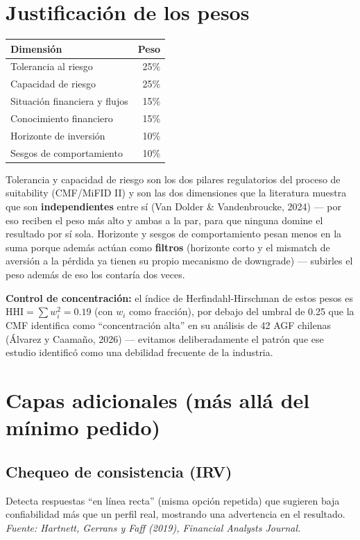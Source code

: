 \documentclass[11pt]{article}
\begin{document}
\section{Justificación de los pesos}

\begin{center}
\renewcommand{\arraystretch}{1.3}
\begin{tabular}{@{}lr@{}}
\toprule
\textbf{Dimensión} & \textbf{Peso} \\
\midrule
Tolerancia al riesgo & 25\% \\
Capacidad de riesgo & 25\% \\
Situación financiera y flujos & 15\% \\
Conocimiento financiero & 15\% \\
Horizonte de inversión & 10\% \\
Sesgos de comportamiento & 10\% \\
\bottomrule
\end{tabular}
\end{center}

Tolerancia y capacidad de riesgo son los dos pilares regulatorios del proceso de suitability (CMF/MiFID II) y son las dos dimensiones que la literatura muestra que son \textbf{independientes} entre sí (Van Dolder \& Vandenbroucke, 2024) --- por eso reciben el peso más alto y ambas a la par, para que ninguna domine el resultado por sí sola. Horizonte y sesgos de comportamiento pesan menos en la suma porque además actúan como \textbf{filtros} (horizonte corto y el mismatch de aversión a la pérdida ya tienen su propio mecanismo de downgrade) --- subirles el peso además de eso los contaría dos veces.

\begin{callout}
\textbf{Control de concentración:} el índice de Herfindahl-Hirschman de estos pesos es $\mathrm{HHI} = \sum w_i^2 = 0.19$ (con $w_i$ como fracción), por debajo del umbral de 0.25 que la CMF identifica como ``concentración alta'' en su análisis de 42 AGF chilenas (Álvarez y Caamaño, 2026) --- evitamos deliberadamente el patrón que ese estudio identificó como una debilidad frecuente de la industria.
\end{callout}

\section{Capas adicionales (más allá del mínimo pedido)}
\label{sec:capas}

\subsection{Chequeo de consistencia (IRV)}
Detecta respuestas ``en línea recta'' (misma opción repetida) que sugieren baja confiabilidad más que un perfil real, mostrando una advertencia en el resultado. \textit{Fuente: Hartnett, Gerrans y Faff (2019), Financial Analysts Journal.}
\end{document}
